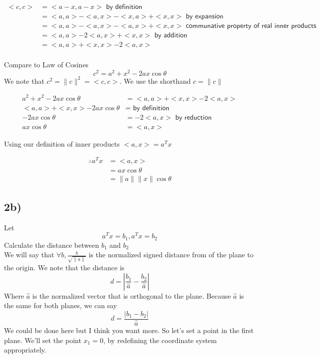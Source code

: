 \documentclass[12pt,letter]{article}
\begin{document}
\begin{align*}
    <c,c> &= <a-x, a-x>  \textsf{ by definition}\\
          &= <a,a> - <a,x> - <x,a> + <x,x> \textsf{ by expansion}\\
          &= <a,a> - <a,x> - <a,x> + <x,x> \textsf{ communative property of real inner products}\\
          &= <a,a> -2<a,x> + <x,x> \textsf{ by addition}\\
          &= <a,a> + <x,x> - 2<a,x> \\
\end{align*}

Compare to Law of Cosines
\[
    c^2 = a^2 + x^2 -2ax\cos\theta
\]
We note that $c^2 = \|c\|^2 = <c,c>$. We use the shorthand $c=\|c\|$

\begin{align*}
    a^2 + x^2 - 2ax\cos\theta &= <a,a> + <x,x> - 2<a,x> \\
    <a,a> + <x,x> - 2ax\cos\theta &= \textsf{ by definition} \\
    -2ax\cos\theta &= -2<a,x> \textsf{ by reduction} \\
    ax\cos\theta &= <a,x> 
\end{align*}

Using our definition of inner products $<a,x> = a^Tx$

\begin{align*}
    \therefore a^Tx &= <a,x> \\
                    &= ax\cos\theta \\
                    &= \|a\|\|x\|\cos\theta
\end{align*}


\subsection*{2b)}
Let
\[
    a^Tx = b_1, a^Tx = b_2
\]
Calculate the distance between $b_1$ and $b_2$ \\
We will say that $\forall b, \frac{b}{\sqrt{\|a\|}}$ is the normalized signed distance 
from of the plane to the origin. We note that the distance is
\[
    d = \left|\frac{b_1}{\hat{a}} - \frac{b_2}{\hat{a}}\right|
\]
Where $\hat a$ is the normalized vector that is orthogonal to the plane. Because
$\hat a$ is the same for both planes, we can say
\[
    d = \frac{|b_1 - b_2|}{\hat a}
\]
We could be done here but I think you want more. So let's set a point in the
first plane. We'll set the point $x_1=0$, by redefining the coordinate system
appropriately. 
\end{document}
